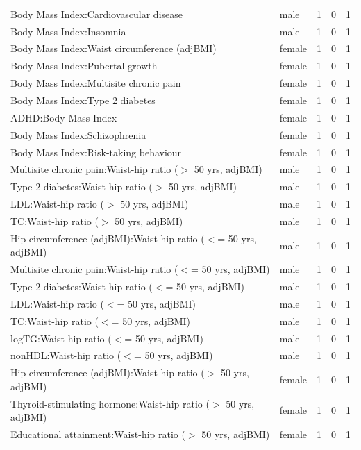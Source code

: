 \begin{table}[ht]
\begin{tabular}{llrrr}
  Body Mass Index:Cardiovascular disease & male &   1 &   0 &   1 \\ 
  Body Mass Index:Insomnia & male &   1 &   0 &   1 \\ 
  Body Mass Index:Waist circumference (adjBMI) & female &   1 &   0 &   1 \\ 
  Body Mass Index:Pubertal growth & female &   1 &   0 &   1 \\ 
  Body Mass Index:Multisite chronic pain & female &   1 &   0 &   1 \\ 
  Body Mass Index:Type 2 diabetes & female &   1 &   0 &   1 \\ 
  ADHD:Body Mass Index & female &   1 &   0 &   1 \\ 
  Body Mass Index:Schizophrenia & female &   1 &   0 &   1 \\ 
  Body Mass Index:Risk-taking behaviour & female &   1 &   0 &   1 \\ 
  Multisite chronic pain:Waist-hip ratio ($>$ 50 yrs, adjBMI) & male &   1 &   0 &   1 \\ 
  Type 2 diabetes:Waist-hip ratio ($>$ 50 yrs, adjBMI) & male &   1 &   0 &   1 \\ 
  LDL:Waist-hip ratio ($>$ 50 yrs, adjBMI) & male &   1 &   0 &   1 \\ 
  TC:Waist-hip ratio ($>$ 50 yrs, adjBMI) & male &   1 &   0 &   1 \\ 
  Hip circumference (adjBMI):Waist-hip ratio ($<$= 50 yrs, adjBMI) & male &   1 &   0 &   1 \\ 
  Multisite chronic pain:Waist-hip ratio ($<$= 50 yrs, adjBMI) & male &   1 &   0 &   1 \\ 
  Type 2 diabetes:Waist-hip ratio ($<$= 50 yrs, adjBMI) & male &   1 &   0 &   1 \\ 
  LDL:Waist-hip ratio ($<$= 50 yrs, adjBMI) & male &   1 &   0 &   1 \\ 
  TC:Waist-hip ratio ($<$= 50 yrs, adjBMI) & male &   1 &   0 &   1 \\ 
  logTG:Waist-hip ratio ($<$= 50 yrs, adjBMI) & male &   1 &   0 &   1 \\ 
  nonHDL:Waist-hip ratio ($<$= 50 yrs, adjBMI) & male &   1 &   0 &   1 \\ 
  Hip circumference (adjBMI):Waist-hip ratio ($>$ 50 yrs, adjBMI) & female &   1 &   0 &   1 \\ 
  Thyroid-stimulating hormone:Waist-hip ratio ($>$ 50 yrs, adjBMI) & female &   1 &   0 &   1 \\ 
  Educational attainment:Waist-hip ratio ($>$ 50 yrs, adjBMI) & female &   1 &   0 &   1 \\ 

\end{tabular}
\end{table}
